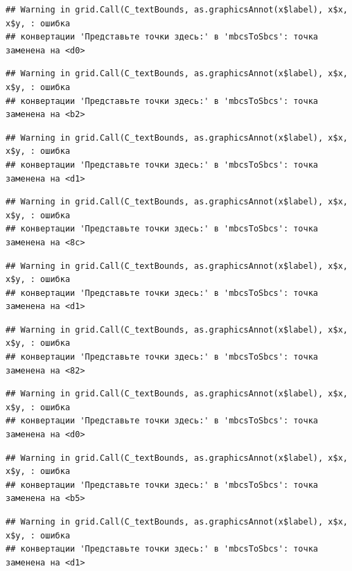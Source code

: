 \documentclass[]{book}
\begin{document}
\begin{verbatim}
## Warning in grid.Call(C_textBounds, as.graphicsAnnot(x$label), x$x, x$y, : ошибка
## конвертации 'Представьте точки здесь:' в 'mbcsToSbcs': точка заменена на <d0>
\end{verbatim}

\begin{verbatim}
## Warning in grid.Call(C_textBounds, as.graphicsAnnot(x$label), x$x, x$y, : ошибка
## конвертации 'Представьте точки здесь:' в 'mbcsToSbcs': точка заменена на <b2>
\end{verbatim}

\begin{verbatim}
## Warning in grid.Call(C_textBounds, as.graphicsAnnot(x$label), x$x, x$y, : ошибка
## конвертации 'Представьте точки здесь:' в 'mbcsToSbcs': точка заменена на <d1>
\end{verbatim}

\begin{verbatim}
## Warning in grid.Call(C_textBounds, as.graphicsAnnot(x$label), x$x, x$y, : ошибка
## конвертации 'Представьте точки здесь:' в 'mbcsToSbcs': точка заменена на <8c>
\end{verbatim}

\begin{verbatim}
## Warning in grid.Call(C_textBounds, as.graphicsAnnot(x$label), x$x, x$y, : ошибка
## конвертации 'Представьте точки здесь:' в 'mbcsToSbcs': точка заменена на <d1>
\end{verbatim}

\begin{verbatim}
## Warning in grid.Call(C_textBounds, as.graphicsAnnot(x$label), x$x, x$y, : ошибка
## конвертации 'Представьте точки здесь:' в 'mbcsToSbcs': точка заменена на <82>
\end{verbatim}

\begin{verbatim}
## Warning in grid.Call(C_textBounds, as.graphicsAnnot(x$label), x$x, x$y, : ошибка
## конвертации 'Представьте точки здесь:' в 'mbcsToSbcs': точка заменена на <d0>
\end{verbatim}

\begin{verbatim}
## Warning in grid.Call(C_textBounds, as.graphicsAnnot(x$label), x$x, x$y, : ошибка
## конвертации 'Представьте точки здесь:' в 'mbcsToSbcs': точка заменена на <b5>
\end{verbatim}

\begin{verbatim}
## Warning in grid.Call(C_textBounds, as.graphicsAnnot(x$label), x$x, x$y, : ошибка
## конвертации 'Представьте точки здесь:' в 'mbcsToSbcs': точка заменена на <d1>
\end{verbatim}
\end{document}
